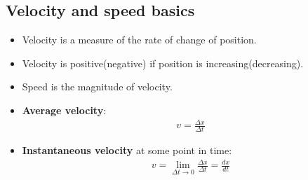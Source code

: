 \documentclass[aspectratio=169,
hyperref={colorlinks,urlcolor=blue}
]{beamer}
\begin{document}
\subsection{Velocity and speed basics}
\label{subsec:velocityandspeedbasics}
{
\begin{itemize}
\item Velocity is a measure of the rate of change of position.
\item Velocity is positive(negative) if position is increasing(decreasing).
\item Speed is the magnitude of velocity.
\item \textbf{Average velocity}:
\begin{align*}
v=\frac{\Delta x}{\Delta t}
\end{align*}
\item<2-> \textbf{Instantaneous velocity} at some point in time:
\begin{align*}
v=\lim_{\Delta t \to 0}\frac{\Delta x}{\Delta t}=\frac{dx}{dt}
\end{align*}
\end{itemize}
}
\end{document}

